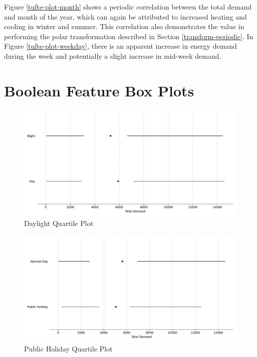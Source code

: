 \documentclass[mstat,12pt]{unswthesis}
\begin{document}
Figure \ref{tufte-plot-month} shows a periodic correlation between the total demand and month of the year, which can again be attributed to increased heating and cooling in winter and summer. This correlation also demonstrates the value in performing the polar transformation described in Section \ref{transform-periodic}. In Figure \ref{tufte-plot-weekday}, there is an apparent increase in energy demand during the week and potentially a slight increase in mid-week demand.

\hypertarget{boolean-box-plots}{%
\section{Boolean Feature Box Plots}\label{boolean-box-plots}}

\begin{figure}[H]
\centerline{\includegraphics[width=\columnwidth]{Final Report/Figures/Plots/tufte_plot_is_daylight.pdf}}
\caption{Daylight Quartile Plot}
\label{tufte-plot-daylight}
\end{figure}

\begin{figure}[H]
\centerline{\includegraphics[width=\columnwidth]{Final Report/Figures/Plots/tufte_plot_is_public_holiday.pdf}}
\caption{Public Holiday Quartile Plot}
\label{tufte-plot-holiday}
\end{figure}
\end{document}
